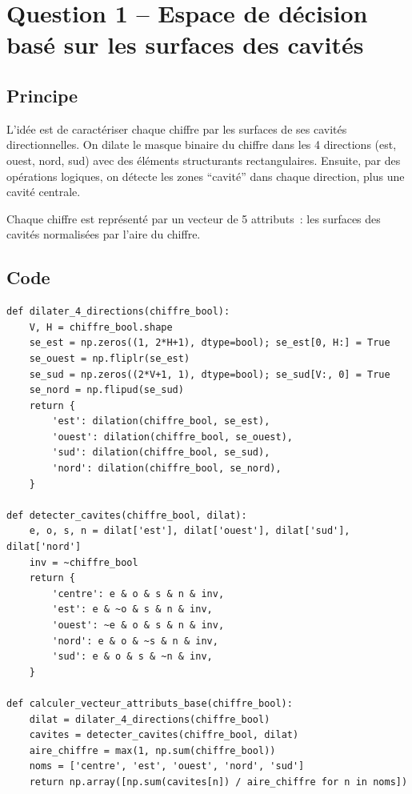 \documentclass[a4paper,11pt]{article}
\begin{document}
\section{Question 1 -- Espace de décision basé sur les surfaces des cavités}

\subsection{Principe}

L'idée est de caractériser chaque chiffre par les surfaces de ses cavités directionnelles. On dilate le masque binaire du chiffre dans les 4 directions (est, ouest, nord, sud) avec des éléments structurants rectangulaires. Ensuite, par des opérations logiques, on détecte les zones ``cavité'' dans chaque direction, plus une cavité centrale.

Chaque chiffre est représenté par un vecteur de 5 attributs~: les surfaces des cavités normalisées par l'aire du chiffre.

\subsection{Code}

\begin{lstlisting}[style=python, caption={Calcul de l'espace de décision (cavités directionnelles).}]
def dilater_4_directions(chiffre_bool):
    V, H = chiffre_bool.shape
    se_est = np.zeros((1, 2*H+1), dtype=bool); se_est[0, H:] = True
    se_ouest = np.fliplr(se_est)
    se_sud = np.zeros((2*V+1, 1), dtype=bool); se_sud[V:, 0] = True
    se_nord = np.flipud(se_sud)
    return {
        'est': dilation(chiffre_bool, se_est),
        'ouest': dilation(chiffre_bool, se_ouest),
        'sud': dilation(chiffre_bool, se_sud),
        'nord': dilation(chiffre_bool, se_nord),
    }

def detecter_cavites(chiffre_bool, dilat):
    e, o, s, n = dilat['est'], dilat['ouest'], dilat['sud'], dilat['nord']
    inv = ~chiffre_bool
    return {
        'centre': e & o & s & n & inv,
        'est': e & ~o & s & n & inv,
        'ouest': ~e & o & s & n & inv,
        'nord': e & o & ~s & n & inv,
        'sud': e & o & s & ~n & inv,
    }

def calculer_vecteur_attributs_base(chiffre_bool):
    dilat = dilater_4_directions(chiffre_bool)
    cavites = detecter_cavites(chiffre_bool, dilat)
    aire_chiffre = max(1, np.sum(chiffre_bool))
    noms = ['centre', 'est', 'ouest', 'nord', 'sud']
    return np.array([np.sum(cavites[n]) / aire_chiffre for n in noms])
\end{lstlisting}
\end{document}
